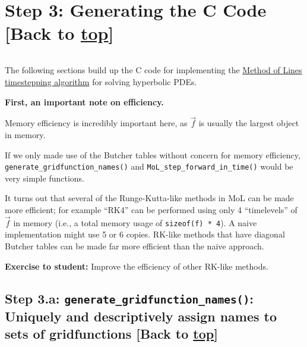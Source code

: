 \documentclass[landscape,letterpaper,10pt,english]{article}
\begin{document}
    \hypertarget{step-3-generating-the-c-code-back-to-top}{%
\section{\texorpdfstring{Step 3: Generating the C Code {[}Back to
\hyperref[toc]{top}{]}}{Step 3: Generating the C Code {[}Back to {]}}}\label{step-3-generating-the-c-code-back-to-top}}

\[\label{ccode}\]

The following sections build up the C code for implementing the
\href{http://www.scholarpedia.org/article/Method_of_lines}{Method of
Lines timestepping algorithm} for solving hyperbolic PDEs.

\textbf{First, an important note on efficiency.}

Memory efficiency is incredibly important here, as \(\vec{f}\) is
usually the largest object in memory.

If we only made use of the Butcher tables without concern for memory
efficiency, \texttt{generate\_gridfunction\_names()} and
\texttt{MoL\_step\_forward\_in\_time()} would be very simple functions.

It turns out that several of the Runge-Kutta-like methods in MoL can be
made more efficient; for example ``RK4'' can be performed using only 4
``timelevels'' of \(\vec{f}\) in memory (i.e., a total memory usage of
\texttt{sizeof(f)\ *\ 4}). A naive implementation might use 5 or 6
copies. RK-like methods that have diagonal Butcher tables can be made
far more efficient than the naive approach.

\textbf{Exercise to student:} Improve the efficiency of other RK-like
methods.

    \hypertarget{step-3.a-generate_gridfunction_names-uniquely-and-descriptively-assign-names-to-sets-of-gridfunctions-back-to-top}{%
\subsection{\texorpdfstring{Step 3.a:
\texttt{generate\_gridfunction\_names()}: Uniquely and descriptively
assign names to sets of gridfunctions {[}Back to
\hyperref[toc]{top}{]}}{Step 3.a: generate\_gridfunction\_names(): Uniquely and descriptively assign names to sets of gridfunctions {[}Back to {]}}}\label{step-3.a-generate_gridfunction_names-uniquely-and-descriptively-assign-names-to-sets-of-gridfunctions-back-to-top}}

\[\label{generategfnames}\]
\end{document}
